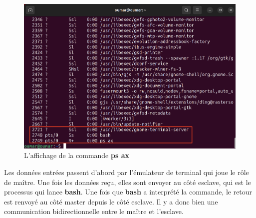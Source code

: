\begin{figure}[h]
    \centering
    \includegraphics[width=0.8\linewidth]{images/emulator-terminal.png}
    \caption{L'affichage de la commande \textbf{ps ax}}
\end{figure}

Les données entrées passent d'abord par l'émulateur de terminal qui joue le rôle de maître. Une fois les données reçu, elles sont envoyer au côté esclave, qui est le processus qui lance \textbf{bash}.
Une fois que \textbf{bash} a interprété la commande, le retour est renvoyé au côté master depuis le côté esclave. Il y a donc bien une communication bidirectionnelle entre le maître et l'esclave.